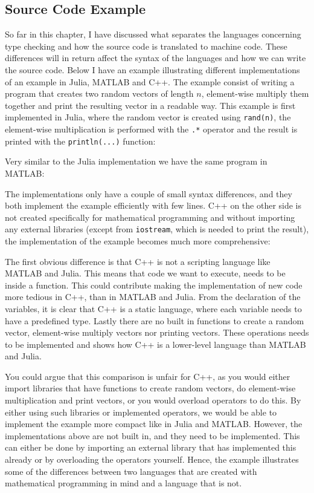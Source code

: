 \subsection{Source Code Example}
So far in this chapter, I have discussed what separates the languages concerning type checking and how the source code is translated to machine code. These differences will in return affect the syntax of the languages and how we can write the source code. Below I have an example illustrating different implementations of an example in Julia, MATLAB and C++. The example consist of writing a program that creates two random vectors of length $n$, element-wise multiply them together and print the resulting vector in a readable way. This example is first implemented in Julia, where the random vector is created using \texttt{rand(n)}, the element-wise multiplication is performed with the \texttt{.*} operator and the result is printed with the \texttt{println(...)} function:

Very similar to the Julia implementation we have the same program in MATLAB:

The implementations only have a couple of small syntax differences, and they both implement the example efficiently with few lines. C++ on the other side is not created specifically for mathematical programming and without importing any external libraries (except from \texttt{iostream}, which is needed to print the result), the implementation of the example becomes much more comprehensive:

The first obvious difference is that C++ is not a scripting language like MATLAB and Julia. This means that code we want to execute, needs to be inside a function. This could contribute making the implementation of new code more tedious in C++, than in MATLAB and Julia. From the declaration of the variables, it is clear that C++ is a static language, where each variable needs to have a predefined type. Lastly there are no built in functions to create a random vector, element-wise multiply vectors nor printing vectors. These operations needs to be implemented and shows how C++ is a lower-level language than MATLAB and Julia.

You could argue that this comparison is unfair for C++, as you would either import libraries that have functions to create random vectors, do element-wise multiplication and print vectors, or you would overload operators to do this. By either using such libraries or implemented operators, we would be able to implement the example more compact like in Julia and MATLAB. However, the implementations above are not built in, and they need to be implemented. This can either be done by importing an external library that has implemented this already or by overloading the operators yourself. Hence, the example illustrates some of the differences between two languages that are created with mathematical programming in mind and a language that is not.

